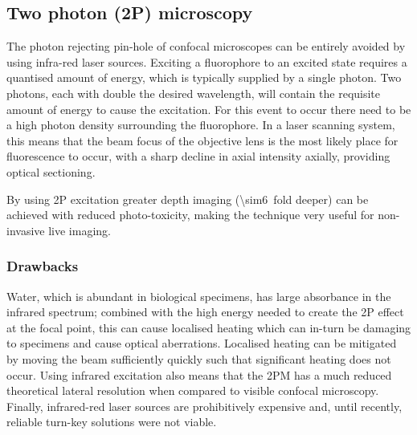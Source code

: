 \subsection{Two photon (2P) microscopy}


The photon rejecting pin-hole of confocal microscopes can be entirely avoided by using infra-red laser sources.
Exciting a fluorophore to an excited state requires a quantised amount of energy, which is typically supplied by a single photon.
Two photons, each with double the desired wavelength, will contain the requisite amount of energy to cause the excitation.
For this event to occur there need to be a high photon density surrounding the fluorophore.
In a laser scanning system, this means that the beam focus of the objective lens is the most likely place for fluorescence to occur, with a sharp decline in axial intensity axially, providing optical sectioning.

By using 2P excitation greater depth imaging (\SI{\sim6}{fold} deeper) can be achieved with reduced photo-toxicity, making the technique very useful for non-invasive live imaging.

\subsubsection{Drawbacks}

Water, which is abundant in biological specimens, has large absorbance in the infrared spectrum; combined with the high energy needed to create the 2P effect at the focal point, this can cause localised heating which can in-turn be damaging to specimens and cause optical aberrations.
Localised heating can be mitigated by moving the beam sufficiently quickly such that significant heating does not occur.
Using infrared excitation also means that the 2PM has a much reduced theoretical lateral resolution when compared to visible confocal microscopy.
Finally, infrared-red laser sources are prohibitively expensive and, until recently, reliable turn-key solutions were not viable.

